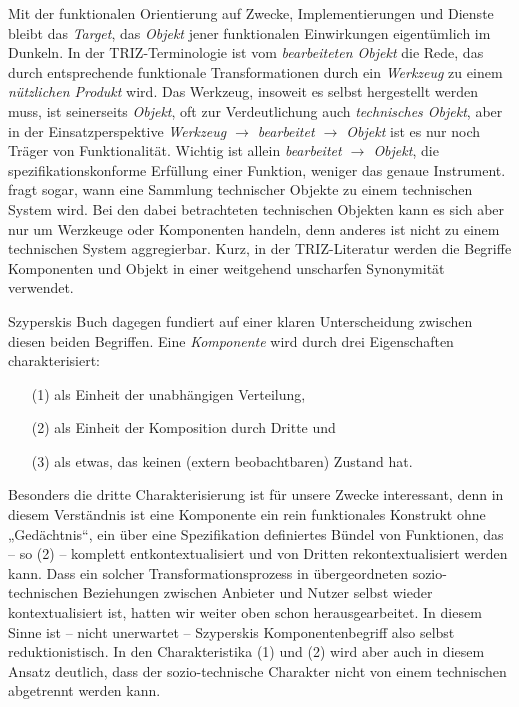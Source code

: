 \documentclass[12pt,a4paper]{article}
\begin{document}
Mit der funktionalen Orientierung auf Zwecke, Implementierungen und Dienste
bleibt das \emph{Target}, das \emph{Objekt} jener funktionalen Einwirkungen
eigentümlich im Dunkeln. In der TRIZ-Terminologie ist vom \emph{bearbeiteten
  Objekt} die Rede, das durch entsprechende funktionale Transformationen durch
ein \emph{Werkzeug} zu einem \emph{nützlichen Produkt} wird. Das Werkzeug,
insoweit es selbst hergestellt werden muss, ist seinerseits \emph{Objekt}, oft
zur Verdeutlichung auch \emph{technisches Objekt}, aber in der
Einsatzperspektive \emph{Werkzeug $\to$ bearbeitet $\to$ Objekt} ist es nur
noch Träger von Funktionalität. Wichtig ist allein \emph{bearbeitet $\to$
  Objekt}, die spezifikationskonforme Erfüllung einer Funktion, weniger das
genaue Instrument. \cite{Shpakovsky2003} fragt sogar, wann eine Sammlung
technischer Objekte zu einem technischen System wird. Bei den dabei
betrachteten technischen Objekten kann es sich aber nur um Werzkeuge oder
Komponenten handeln, denn anderes ist nicht zu einem technischen System
aggregierbar. Kurz, in der TRIZ-Literatur werden die Begriffe Komponenten und
Objekt in einer weitgehend unscharfen Synonymität verwendet.

Szyperskis Buch \cite{Szyperski2002} dagegen fundiert auf einer klaren
Unterscheidung zwischen diesen beiden Begriffen. Eine \emph{Komponente} wird
durch drei Eigenschaften charakterisiert:
\begin{itemize}
\item[(1)] als Einheit der unabhängigen Verteilung,
\item[(2)] als Einheit der Komposition durch Dritte und
\item[(3)] als etwas, das keinen (extern beobachtbaren) Zustand hat.
\end{itemize}
Besonders die dritte Charakterisierung ist für unsere Zwecke interessant, denn
in diesem Verständnis ist eine Komponente ein rein funktionales Konstrukt ohne
„Gedächtnis“, ein über eine Spezifikation definiertes Bündel von Funktionen,
das -- so (2) -- komplett entkontextualisiert und von Dritten
rekontextualisiert werden kann.  Dass ein solcher Transformationsprozess in
übergeordneten sozio-technischen Beziehungen zwischen Anbieter und Nutzer
selbst wieder kontextualisiert ist, hatten wir weiter oben schon
herausgearbeitet.  In diesem Sinne ist -- nicht unerwartet -- Szyperskis
Komponentenbegriff also selbst reduktionistisch.  In den Charakteristika (1)
und (2) wird aber auch in diesem Ansatz deutlich, dass der sozio-technische
Charakter nicht von einem technischen abgetrennt werden kann.
\end{document}
